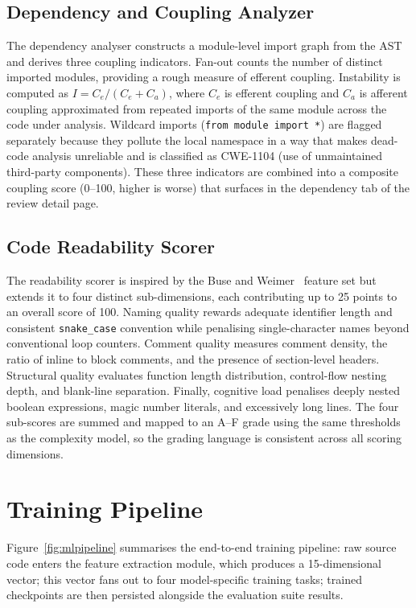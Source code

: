 \documentclass[12pt, oneside]{report}
\begin{document}
\subsection{Dependency and Coupling Analyzer}
\label{ssec:dependency}

The dependency analyser constructs a module-level import graph from the AST and
derives three coupling indicators. Fan-out counts the number of distinct imported
modules, providing a rough measure of efferent coupling. Instability is computed as
$I = C_e / (C_e + C_a)$, where $C_e$ is efferent coupling and $C_a$ is afferent
coupling approximated from repeated imports of the same module across the code
under analysis. Wildcard imports (\texttt{from~module~import~*}) are flagged
separately because they pollute the local namespace in a way that makes dead-code
analysis unreliable and is classified as CWE-1104 (use of unmaintained third-party
components). These three indicators are combined into a composite coupling score
(0--100, higher is worse) that surfaces in the dependency tab of the review detail
page.

\subsection{Code Readability Scorer}
\label{ssec:readability}

The readability scorer is inspired by the Buse and Weimer~\cite{buse2010} feature
set but extends it to four distinct sub-dimensions, each contributing up to 25 points
to an overall score of 100. Naming quality rewards adequate identifier length and
consistent \texttt{snake\_case} convention while penalising single-character names
beyond conventional loop counters. Comment quality measures comment density,
the ratio of inline to block comments, and the presence of section-level headers.
Structural quality evaluates function length distribution, control-flow nesting depth,
and blank-line separation. Finally, cognitive load penalises deeply nested boolean
expressions, magic number literals, and excessively long lines. The four sub-scores
are summed and mapped to an A--F grade using the same thresholds as the complexity
model, so the grading language is consistent across all scoring dimensions.

\section{Training Pipeline}
\label{sec:training}

Figure~\ref{fig:mlpipeline} summarises the end-to-end training pipeline: raw source code enters the feature extraction module, which produces a 15-dimensional vector; this vector fans out to four model-specific training tasks; trained checkpoints are then persisted alongside the evaluation suite results.
\end{document}
